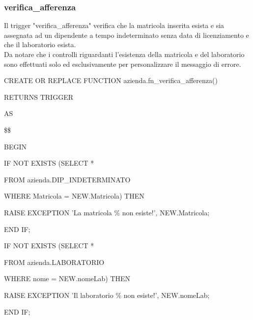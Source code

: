     \subsubsection{verifica\_afferenza}
    Il trigger "verifica\_afferenza" verifica che la matricola inserita esista e sia assegnata ad un dipendente a tempo indeterminato senza data di licenziamento e che il laboratorio esista.\\
    Da notare che i controlli riguardanti l'esistenza della matricola e del laboratorio sono effettuati solo ed esclusivamente per personalizzare il messaggio di errore.
    \ttfamily
        \begin{flushleft}
            \begin{description}
                \item CREATE OR REPLACE FUNCTION azienda.fn\_verifica\_afferenza()
                \item RETURNS TRIGGER
                \item AS
                \item \$\$
                \item BEGIN
                \begin{description}
                    \item IF NOT EXISTS (SELECT *
                    \item \hspace{2.6cm} FROM azienda.DIP\_INDETERMINATO
                    \item \hspace{2.6cm} WHERE Matricola = NEW.Matricola) THEN
                    \vspace{0.2cm}
                    \begin{description}
                        \item RAISE EXCEPTION 'La matricola \% non esiste!', NEW.Matricola;
                    \end{description}
                    \item END IF;
                \end{description}
    
                \vspace{0.5cm}
            
                \begin{description}
                    \item IF NOT EXISTS (SELECT *
                    \item \hspace{2.6cm} FROM azienda.LABORATORIO
                    \item \hspace{2.6cm} WHERE nome = NEW.nomeLab) THEN
                    \vspace{0.2cm}
                    \begin{description}
                        \item RAISE EXCEPTION 'Il laboratorio \% non esiste!', NEW.nomeLab;
                    \end{description}
                    \item END IF;
                \end{description}


\end{description}
\end{flushleft}
